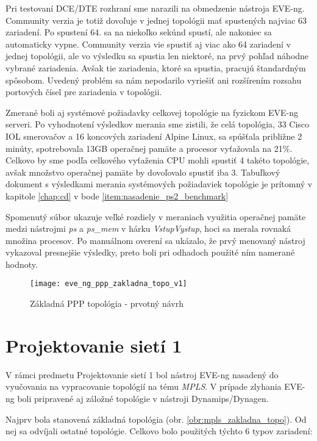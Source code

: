 Pri testovaní DCE/DTE rozhraní sme narazili na obmedzenie nástroja EVE-ng. Community verzia je totiž dovoľuje v jednej topológii mať spustených najviac 63 zariadení. Po spustení 64. sa na niekoľko sekúnd spustí, ale nakoniec sa automaticky vypne. Community verzia vie spustiť aj viac ako 64 zariadení v jednej topológii, ale vo výsledku sa spustia len niektoré, na prvý pohľad náhodne vybrané zariadenia. Avšak tie zariadenia, ktoré sa spustia, pracujú štandardným spôsobom. Uvedený problém sa nám nepodarilo vyriešiť ani rozšírením rozsahu portových čísel pre zariadenia v topológii.
  
Zmerané boli aj systémové požiadavky celkovej topológie na fyzickom EVE-ng serveri. Po vyhodnotení výsledkov merania sme zistili, že celá topológia, 33 Cisco IOL smerovačov a 16 koncových zariadení Alpine Linux, sa spúšťala približne 2 minúty, spotrebovala 13GB operačnej pamäte a procesor vyťažovala na 21\%. Celkovo by sme podľa celkového vyťaženia CPU mohli spustiť 4 takéto topológie, avšak množstvo operačnej pamäte by dovoľovalo spustiť iba 3. Tabuľkový dokument s výsledkami merania systémových požiadaviek topológie je prítomný v kapitole \ref{chap:cd} v bode \ref{item:nasadenie_ps2_benchmark}

Spomenutý súbor ukazuje veľké rozdiely v meraniach využitia operačnej pamäte medzi nástrojmi \emph{ps} a \emph{ps\_mem} v hárku \emph{VstupVystup}, hoci sa merala rovnaká množina procesov. Po manuálnom overení sa ukázalo, že prvý menovaný nástroj vykazoval presnejšie výsledky, preto boli pri odhadoch použité ním namerané hodnoty.

\begin{figure}
    \centering
    \texttt{[image: eve\_ng\_ppp\_zakladna\_topo\_v1]}
    \caption{Základná PPP topológia - prvotný návrh}
    \label{obr:eve_ng_ppp_zakladna_topo_v1}
\end{figure}





\section{Projektovanie sietí 1}

V rámci predmetu Projektovanie sietí 1 bol nástroj EVE-ng nasadený do vyučovania na vypracovanie topológií na tému \emph{MPLS}. V prípade zlyhania EVE-ng boli pripravené aj záložné topológie v nástroji Dynamips/Dynagen.

Najprv bola stanovená základná topológia (obr. \ref{obr:mpls_zakladna_topo}). Od nej sa odvíjali ostatné topológie. Celkovo bolo použitých týchto 6 typov zariadení:

